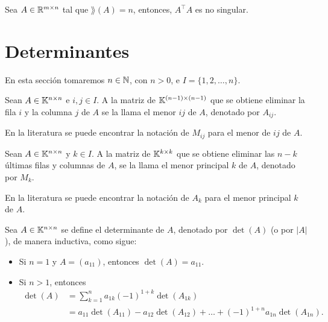 \documentclass[a4,11pt]{aleph-notas}
\begin{document}
\begin{teo}
    Sea $A\in\Mat{m}{n}$ tal que $\rang(A)=n$, entonces, $A^\intercal A$ es no singular.
\end{teo}

\section{Determinantes}

En esta sección tomaremos $n\in \N$, con $n>0$, e $I = \{ 1, 2, \ldots, n\}$.

\begin{defi}[Menor]
    Sean $A\in \Mat[\K]{n}{n}$ e $i,j\in I$. A la matriz de $\Mat[\K]{(n-1)}{(n-1)}$ que se obtiene eliminar la fila $i$ y la columna $j$ de $A$ se la llama el menor $ij$ de $A$, denotado por $A_{ij}$.
\end{defi}

\begin{advertencia}
    En la literatura se puede encontrar la notación de $M_{ij}$ para el menor de $ij$ de $A$.
\end{advertencia}

\begin{defi}
    Sean $A\in \Mat[\K]{n}{n}$ y $k\in I$. A la matriz de $\Mat[\K]{k}{k}$ que se obtiene eliminar las $n-k$ últimas filas y columnas de $A$, se la llama el menor principal $k$ de $A$, denotado por $M_{k}$.
\end{defi}

\begin{advertencia}
    En la literatura se puede encontrar la notación de $A_{k}$ para el menor principal $k$ de $A$.
\end{advertencia}


\begin{defi}[Determinantes] 
    Sea $A\in \Mat[\K]{n}{n}$ se define el determinante de $A$, denotado por $\det(A)$ (o por $|A|$), de manera inductiva, como sigue:
    \begin{itemize}
    \item 
        Si $n=1$ y $A=(a_{11})$, entonces $\det(A) = a_{11}$.
    \item
        Si $n>1$, entonces
        \begin{align*}
            \det(A) 
            & = \sum_{k=1}^n a_{1k}(-1)^{1+k}\det(A_{1k})\\
            & = a_{11}\det(A_{11}) - a_{12}\det(A_{12}) 
            + \ldots +  (-1)^{1+n} a_{1n}\det(A_{1n}).
        \end{align*}
    \end{itemize}
\end{defi}
\end{document}
